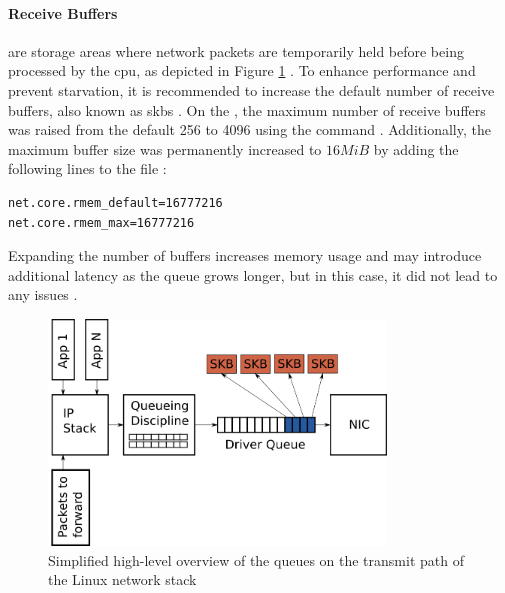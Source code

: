 \paragraph{Receive Buffers} are storage areas where network packets are temporarily held before being processed by the \gls{cpu}, as depicted in Figure \ref{fig:linux_network} \cite{danQueueingLinuxNetwork2013}.
To enhance performance and prevent starvation, it is recommended to increase the default number of receive buffers, also known as \glspl{skb} \cite{lucidvisionlabsReceiveBuffers2020} \cite{danQueueingLinuxNetwork2013}.
On the \jx, the maximum number of receive buffers was raised from the default 256 to 4096 using the command  \cite{danQueueingLinuxNetwork2013}.
Additionally, the maximum buffer size was permanently increased to $16MiB$ by adding the following lines to the  file \cite{redhat10ChangingNetwork}\cite{ibmIBMDocumentationTCPIP2021}:

\begin{verbatim}
net.core.rmem_default=16777216
net.core.rmem_max=16777216
\end{verbatim}

Expanding the number of buffers increases memory usage and may introduce additional latency as the queue grows longer, but in this case, it did not lead to any issues \cite{danQueueingLinuxNetwork2013}.

\begin{figure}[H]
    \centering
    \includegraphics[width=0.8\textwidth]{figures/linux_networking.png}
    \caption{Simplified high-level overview of the queues on the transmit path of the Linux network stack \cite{danQueueingLinuxNetwork2013}}
    \label{fig:linux_network}
\end{figure}

